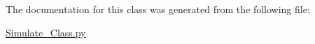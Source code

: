 The documentation for this class was generated from the following file\-:\begin{DoxyCompactItemize}
\item 
\hyperlink{_simulate___class_8py}{Simulate\-\_\-\-Class.\-py}\end{DoxyCompactItemize}
